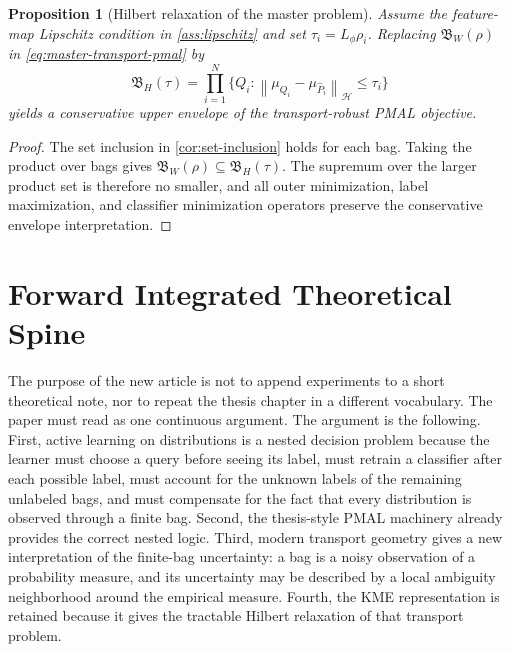 \documentclass[10pt,journal]{IEEEtran}
\newtheorem{proposition}{Proposition}
\newcommand{\Hcal}{\mathcal{H}}
\newcommand{\wh}{\widehat}
\newcommand{\norm}[1]{\left\lVert #1 \right\rVert}
\begin{document}
\begin{proposition}[Hilbert relaxation of the master problem]
\label{prop:master-relaxation}
Assume the feature-map Lipschitz condition in \cref{ass:lipschitz} and set $\tau_i=L_\phi\rho_i$. Replacing $\mathfrak{B}_W(\rho)$ in \eqref{eq:master-transport-pmal} by
\begin{equation}
\label{eq:hilbert-product-ball}
\mathfrak{B}_H(\tau)=
\prod_{i=1}^{N}\{Q_i:\norm{\mu_{Q_i}-\mu_{\wh P_i}}_{\Hcal}\le \tau_i\}
\end{equation}
yields a conservative upper envelope of the transport-robust PMAL objective.
\end{proposition}

\begin{proof}
The set inclusion in \cref{cor:set-inclusion} holds for each bag. Taking the product over bags gives $\mathfrak{B}_W(\rho)\subseteq \mathfrak{B}_H(\tau)$. The supremum over the larger product set is therefore no smaller, and all outer minimization, label maximization, and classifier minimization operators preserve the conservative envelope interpretation.
\end{proof}



\section{Forward Integrated Theoretical Spine}
\label{sec:theoretical-spine}

The purpose of the new article is not to append experiments to a short theoretical note, nor to repeat the thesis chapter in a different vocabulary. The paper must read as one continuous argument. The argument is the following. First, active learning on distributions is a nested decision problem because the learner must choose a query before seeing its label, must retrain a classifier after each possible label, must account for the unknown labels of the remaining unlabeled bags, and must compensate for the fact that every distribution is observed through a finite bag. Second, the thesis-style PMAL machinery already provides the correct nested logic. Third, modern transport geometry gives a new interpretation of the finite-bag uncertainty: a bag is a noisy observation of a probability measure, and its uncertainty may be described by a local ambiguity neighborhood around the empirical measure. Fourth, the KME representation is retained because it gives the tractable Hilbert relaxation of that transport problem.
\end{document}
